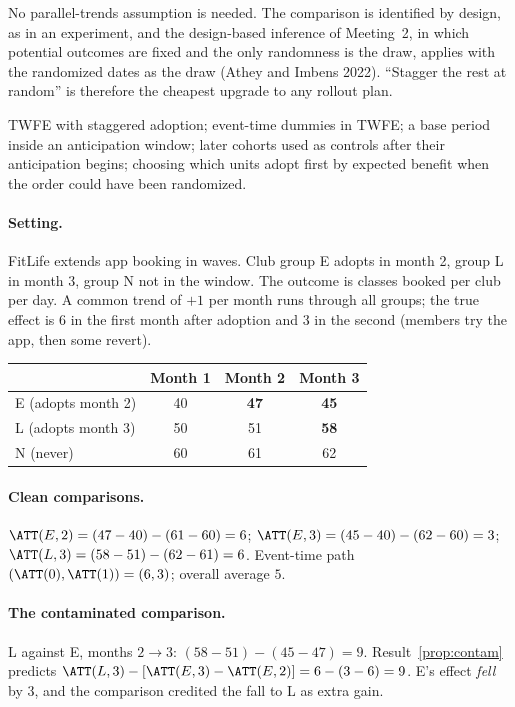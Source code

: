\documentclass[11pt]{article}
\begin{document}
No parallel-trends assumption is needed. The comparison is identified by design, as in an experiment, and the design-based inference of
Meeting~2, in which potential outcomes are fixed and the only randomness is the draw, applies with the randomized dates as the draw (Athey and
Imbens 2022). ``Stagger the rest at random'' is therefore the cheapest upgrade to any rollout plan.

\begin{pitfall}
TWFE with staggered adoption; event-time dummies in TWFE; a base period inside an anticipation window; later cohorts used as controls after their
anticipation begins; choosing which units adopt first by expected benefit when the order could have been randomized.
\end{pitfall}

\sectiontwo

\paragraph{Setting.} FitLife extends app booking in waves. Club group E adopts in month 2, group L in month 3, group N not in the window. The outcome is
classes booked per club per day. A common trend of $+1$ per month runs through all groups; the true effect is $6$ in the first month after adoption and
$3$ in the second (members try the app, then some revert).
\begin{center}
\begin{tabular}{lccc}
\toprule
& Month 1 & Month 2 & Month 3 \\
\midrule
E (adopts month 2) & 40 & \textbf{47} & \textbf{45} \\
L (adopts month 3) & 50 & 51 & \textbf{58} \\
N (never) & 60 & 61 & 62 \\
\bottomrule
\end{tabular}
\end{center}

\paragraph{Clean comparisons.} $\ATT(E,2) = (47 - 40) - (61 - 60) = 6$; $\ATT(E,3) = (45 - 40) - (62 - 60) = 3$; $\ATT(L,3) = (58 - 51) - (62 - 61) = 6$. Event-time path
$(\ATT(0), \ATT(1)) = (6, 3)$; overall average $5$.

\paragraph{The contaminated comparison.} L against E, months $2 \to 3$: $(58 - 51) - (45 - 47) = 9$. Result~\ref{prop:contam} predicts
$\ATT(L,3) - [\ATT(E,3) - \ATT(E,2)] = 6 - (3 - 6) = 9$. E's effect \emph{fell} by $3$, and the comparison credited the fall to L as extra gain.
\end{document}
